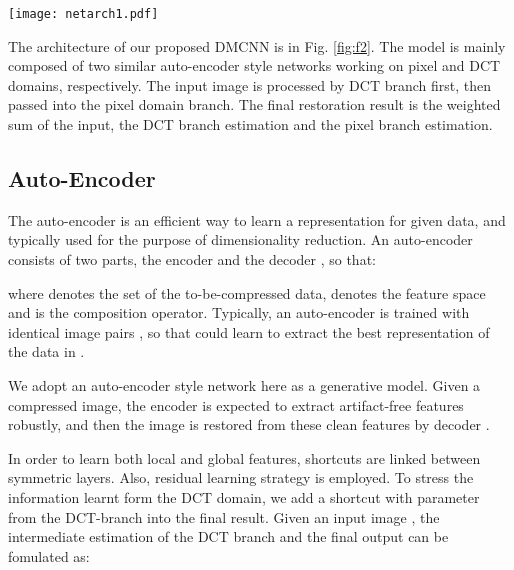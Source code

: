 \documentclass{article}
\begin{document}
\begin{figure*}[htb]
  \vspace{-0.6cm}
  \begin{minipage}[b]{1.0\linewidth}
    \centering
    \centerline{\texttt{[image: netarch1.pdf]}}
    \vspace{-0.2cm}
    \caption{The architecture of Dual-domain Multi-scale
    Convolutional Network (DMCNN).}\medskip
    \label{fig:f2}
  \end{minipage}
  \vspace{-1.0cm}
\end{figure*}

The architecture of our proposed DMCNN is in Fig. \ref{fig:f2}.
The model is mainly composed of two similar auto-encoder style networks
working on pixel and DCT domains, respectively. The input image is processed
by DCT branch first, then passed into the pixel domain branch. The final
restoration result is the weighted sum of the input, the DCT branch estimation
and the pixel branch estimation.
\vspace{-0.2cm}

\subsection{Auto-Encoder}
\label{ssec:ae}

The auto-encoder is an efficient way to learn a representation for given data,
and typically used for the purpose of dimensionality reduction.
An auto-encoder consists of two parts, the encoder  and
the decoder , so that:



where  denotes the set of the to-be-compressed data, 
denotes the feature space and  is the composition operator.
Typically, an auto-encoder is trained with identical
image pairs , so that  could learn to extract the best
representation of the data in .

We adopt an auto-encoder style network here as a generative model. Given
a compressed image, the encoder  is expected to extract
artifact-free features robustly, and then the image is restored from these
clean features by decoder .

In order to learn both local and global features, shortcuts are linked between
symmetric layers. Also, residual learning strategy is employed.
To stress the information learnt form the DCT domain,
we add a shortcut with parameter  from the DCT-branch into the final result.
Given an input image , the intermediate estimation of the DCT branch
 and the final output  can be fomulated as:
\end{document}
